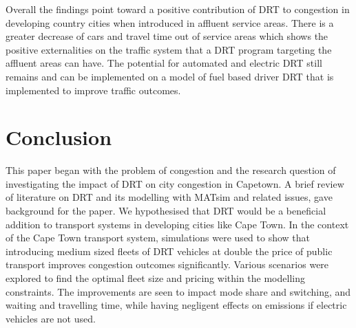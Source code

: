 \documentclass[a4paper]{article}
\begin{document}


 Overall the findings point toward a positive contribution of DRT to congestion in developing country cities when introduced in affluent service areas. There is a greater decrease of cars and travel time out of service areas which shows the positive externalities on the traffic system that a DRT program targeting the affluent areas can have. 
 The potential for automated and electric DRT still remains and can be implemented on a model of fuel based driver DRT that is implemented to improve traffic outcomes.\\
 

\section*{Conclusion}
This paper began with the problem of congestion and the research question of investigating the impact of DRT on city congestion in Capetown. A brief review of literature on DRT and its modelling with MATsim and related issues, gave background for the paper. We hypothesised that DRT would be a beneficial addition to transport systems in developing cities like Cape Town. In the context of the Cape Town transport system, simulations were used to show that introducing medium sized fleets of DRT vehicles at double the price of public transport improves congestion outcomes significantly. Various scenarios were explored to find the optimal fleet size and pricing within the modelling constraints. The improvements are seen to impact mode share and switching, and waiting and travelling time, while having negligent effects on emissions if electric vehicles are not used. 
\end{document}
